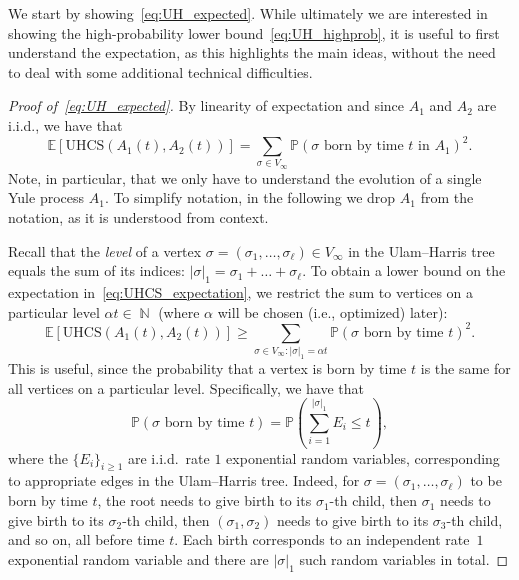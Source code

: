 \documentclass[11pt]{article}
\numberwithin{equation}{section}
\DeclareMathOperator{\N}{\mathbb{N}} %
\newcommand{\p}{\mathbb{P}} %
\newcommand{\E}{\mathbb{E}} %
\newcommand{\UHCS}{\mathrm{UHCS}} %
\theoremstyle{definition}
\begin{document}
We start by showing~\eqref{eq:UH_expected}. 
While ultimately we are interested in showing the high-probability lower bound~\eqref{eq:UH_highprob}, 
it is useful to first understand the expectation, 
as this highlights the main ideas, 
without the need to deal with some additional technical difficulties. 


\begin{proof}[Proof of~\eqref{eq:UH_expected}]
By linearity of expectation and since $A_{1}$ and $A_{2}$ are i.i.d., we have that 
\begin{equation}\label{eq:UHCS_expectation}
\E \left[ \UHCS(A_{1}(t), A_{2}(t)) \right] 
= 
\sum_{\sigma \in V_{\infty}} \p \left( \sigma \text{ born by time } t \text{ in } A_{1} \right)^{2}.
\end{equation}
Note, in particular, that we only have to understand the evolution of a single Yule process $A_{1}$. 
To simplify notation, 
in the following we drop $A_{1}$ from the notation, as it is understood from context. 

Recall that the \emph{level} of a vertex 
$\sigma = (\sigma_{1}, \ldots, \sigma_{\ell}) \in V_{\infty}$ 
in the Ulam--Harris tree equals the sum of its indices: 
$|\sigma|_{1} = \sigma_{1} + \ldots + \sigma_{\ell}$. 
To obtain a lower bound on the expectation in~\eqref{eq:UHCS_expectation}, 
we restrict the sum to vertices on a particular level $\alpha t \in \N$ (where $\alpha$ will be chosen (i.e., optimized) later): 
\begin{equation}\label{eq:UHCS_expectation_LB}
\E \left[ \UHCS(A_{1}(t), A_{2}(t)) \right] 
\geq 
\sum_{\sigma \in V_{\infty}: |\sigma|_{1} = \alpha t} \p \left( \sigma \text{ born by time } t \right)^{2}.
\end{equation}
This is useful, since the probability that a vertex is born by time $t$ is the same for all vertices on a particular level. 
Specifically, we have that
\begin{equation}\label{eq:prob_sum_of_exp}
\p \left( \sigma \text{ born by time } t \right) 
= 
\p \left( \sum_{i=1}^{|\sigma|_{1}} E_{i} \leq t \right),
\end{equation}
where the $\{E_{i}\}_{i \geq 1}$ are i.i.d.\ rate $1$ exponential random variables, 
corresponding to appropriate edges in the Ulam--Harris tree. 
Indeed, for 
$\sigma = (\sigma_{1}, \ldots, \sigma_{\ell})$ 
to be born by time $t$, 
the root needs to give birth to its $\sigma_{1}$-th child, 
then $\sigma_{1}$ needs to give birth to its $\sigma_{2}$-th child, 
then $(\sigma_{1}, \sigma_{2})$ needs to give birth to its $\sigma_{3}$-th child, 
and so on, 
all before time $t$. 
Each birth corresponds to an independent rate~$1$ exponential random variable 
and there are $|\sigma|_{1}$ such random variables in total. 


\end{proof}
\end{document}

